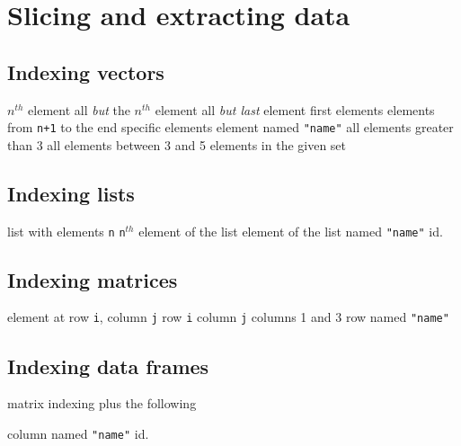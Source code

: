 \section{Slicing and extracting data}{}

\subsection{Indexing vectors}{}
	{ $ n^{th} $ element}
	{all {\it but} the $ n^{th} $ element}
	{all {\it but last} element}
	{first elements}
	{elements from {\tt n+1} to the end}
	{specific elements}
	{element named {\tt "name"}}
	{all elements greater than 3}
	{all elements between 3 and 5}
	{elements in the given set}

\subsection{Indexing lists}{}

	{list with elements {\tt n}}
	{{\tt n}$^{th}$ element of the list}
	{element of the list named {\tt "name"}}
	{id.}


\subsection{Indexing matrices}{}

	{element at row {\tt i}, column {\tt j}}
	{row {\tt i}}
	{column {\tt j}}
	{columns 1 and 3}
	{row named {\tt "name"}}

\subsection{Indexing data frames}{matrix indexing plus the following}

	{column named {\tt "name"}}
	{id.}

